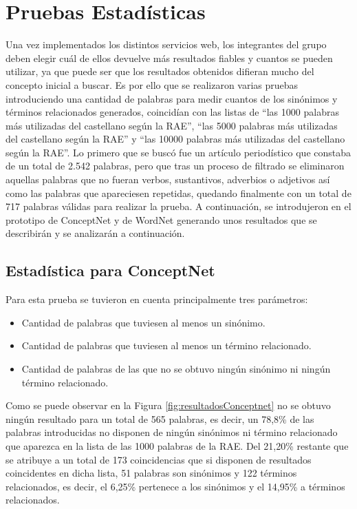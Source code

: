 \section{Pruebas Estadísticas}
\label{cap:sec:pruebasEstadisticas}
Una vez implementados los distintos servicios web, los integrantes del grupo deben elegir cuál de ellos devuelve más resultados fiables y cuantos se pueden utilizar, ya que puede ser que los resultados obtenidos difieran mucho del concepto inicial a buscar.
Es por ello que se realizaron varias pruebas introduciendo una cantidad de palabras para medir cuantos de los sinónimos y términos relacionados generados, coincidían con las listas de ``las 1000 palabras más utilizadas del castellano según la RAE'', ``las 5000 palabras más utilizadas del castellano según la RAE'' y ``las 10000 palabras más utilizadas del castellano según la RAE''. Lo primero que se buscó fue un artículo periodístico que constaba de un total de 2.542 palabras, pero que tras un proceso de filtrado se eliminaron aquellas palabras que no fueran verbos, sustantivos, adverbios o adjetivos así como las palabras que apareciesen repetidas, quedando finalmente con un total de 717 palabras válidas para realizar la prueba. A continuación, se introdujeron en el prototipo de ConceptNet y de WordNet generando unos resultados que se describirán y se analizarán a continuación.

\subsection{Estadística para ConceptNet}
\label{cap:subsec:pruebaConceptnet}

Para esta prueba se tuvieron en cuenta principalmente tres parámetros:
\begin{itemize}
	\item Cantidad de palabras que tuviesen al menos un sinónimo.
	\item Cantidad de palabras que tuviesen al menos un término relacionado.
	\item Cantidad de palabras de las que no se obtuvo ningún sinónimo ni ningún término relacionado.
\end{itemize}


Como se puede observar en la Figura \ref{fig:resultadosConceptnet} no se obtuvo ningún resultado para un total de 565 palabras, es decir, un 78,8\% de las palabras introducidas no disponen de ningún sinónimos ni término relacionado que aparezca en la lista de las 1000 palabras de la RAE. Del 21,20\% restante que se atribuye a un total de 173 coincidencias que si disponen de resultados coincidentes en dicha lista, 51 palabras son sinónimos y 122 términos relacionados, es decir, el 6,25\% pertenece a los sinónimos y el 14,95\% a términos relacionados.

